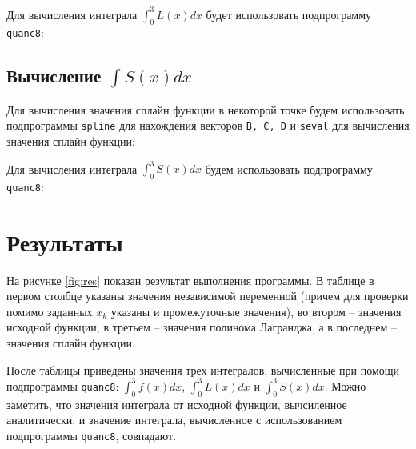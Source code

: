 
\parindent=1cm

Для вычисления интеграла $\int_0^3 L(x)dx$ будет использовать подпрограмму \texttt{quanc8}:


\parindent=1cm


\parindent=1cm

\subsection{Вычисление $\int S(x)dx$}

Для вычисления значения сплайн функции в некоторой точке будем использовать подпрограммы \texttt{spline} для нахождения векторов \texttt{B, C, D} и \texttt{seval} для вычисления значения сплайн функции:


\parindent=1cm

Для вычисления интеграла $\int_0^3 S(x)dx$ будем использовать подпрограмму \texttt{quanc8}:


\parindent=1cm


\parindent=1cm

\section{Результаты}

На рисунке \ref{fig:res} показан результат выполнения программы. В таблице в первом столбце указаны значения независимой переменной (причем для проверки помимо заданных $x_k$ указаны и промежуточные значения), во втором -- значения исходной функции, в третьем -- значения полинома Лагранджа, а в последнем -- значения сплайн функции.

После таблицы приведены значения трех интегралов, вычисленные при помощи подпрограммы \texttt{quanc8}: $\int_0^3 f(x)dx$, $\int_0^3 L(x)dx$ и $\int_0^3 S(x)dx$. Можно заметить, что значения интеграла от исходной функции, вычсиленное аналитически, и значение интеграла, вычисленное с использованием подпрограммы \texttt{quanc8}, совпадают.

